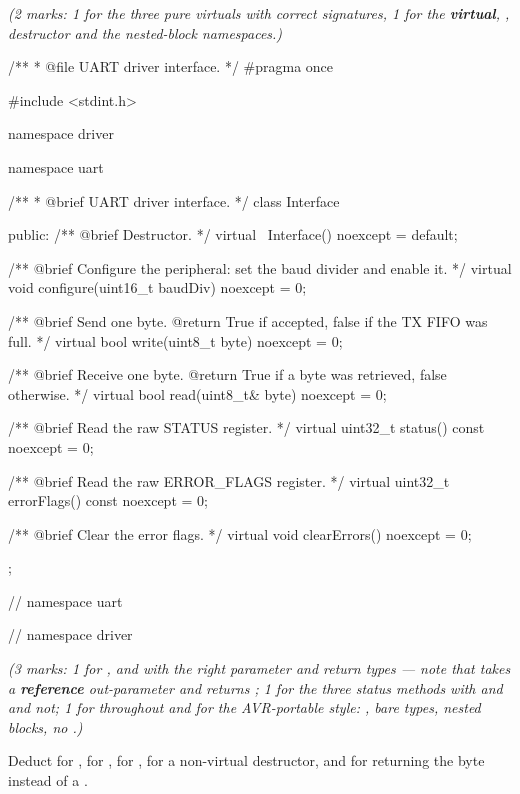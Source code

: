 {\itshape (2 marks: 1 for the three pure virtuals with correct signatures, 1 for the
\textbf{virtual}, ,  destructor and the nested-block namespaces.)\par}

\begin{cppcode}
/**
 * @file UART driver interface.
 */
#pragma once

#include <stdint.h>

namespace driver
{
namespace uart
{
/**
 * @brief UART driver interface.
 */
class Interface
{
public:
    /** @brief Destructor. */
    virtual ~Interface() noexcept = default;

    /** @brief Configure the peripheral: set the baud divider and enable it. */
    virtual void configure(uint16_t baudDiv) noexcept = 0;

    /** @brief Send one byte. @return True if accepted, false if the TX FIFO was full. */
    virtual bool write(uint8_t byte) noexcept = 0;

    /** @brief Receive one byte. @return True if a byte was retrieved, false otherwise. */
    virtual bool read(uint8_t& byte) noexcept = 0;

    /** @brief Read the raw STATUS register. */
    virtual uint32_t status() const noexcept = 0;

    /** @brief Read the raw ERROR_FLAGS register. */
    virtual uint32_t errorFlags() const noexcept = 0;

    /** @brief Clear the error flags. */
    virtual void clearErrors() noexcept = 0;
};
} // namespace uart
} // namespace driver
\end{cppcode}

{\itshape (3 marks: 1 for ,  and  with the right parameter and
return types --- note that  takes a \textbf{reference} out-parameter and returns
; 1 for the three status methods with  and 
\textbf{} and  not; 1 for  throughout and for the
AVR-portable style: , bare types, nested blocks, no \code{[[nodiscard]]}.)\par}

\medskip
Deduct for , for , for \code{[[nodiscard]]}, for a
non-virtual destructor, and for  returning the byte instead of a .

